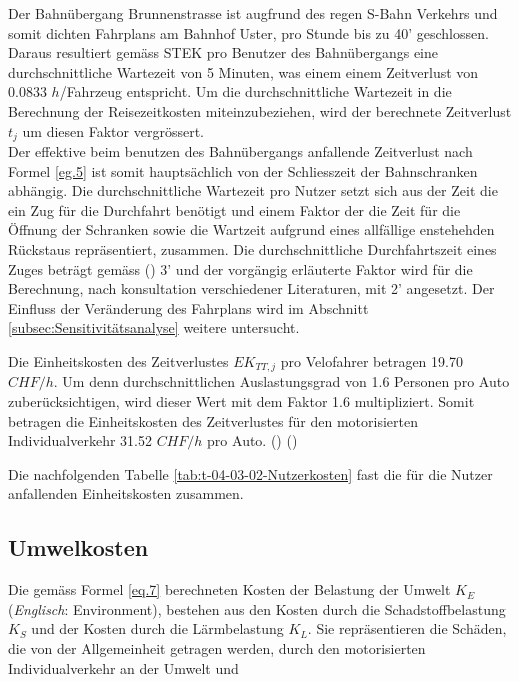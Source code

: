 \begin{IMleftrightskip}
Der Bahnübergang Brunnenstrasse ist augfrund des regen S-Bahn Verkehrs und somit dichten Fahrplans am Bahnhof Uster, pro Stunde bis zu 40' geschlossen. Daraus resultiert gemäss STEK pro Benutzer des Bahnübergangs eine durchschnittliche Wartezeit von 5 Minuten, was einem einem Zeitverlust von 0.0833 $h$/Fahrzeug entspricht. Um die durchschnittliche Wartezeit in die Berechnung der Reisezeitkosten miteinzubeziehen, wird der berechnete Zeitverlust $t_{j}$ um diesen Faktor vergrössert. \\
Der effektive beim benutzen des Bahnübergangs anfallende Zeitverlust nach Formel \ref{eg.5} ist somit hauptsächlich von der Schliesszeit der Bahnschranken abhängig. Die durchschnittliche Wartezeit pro Nutzer setzt sich aus der Zeit die ein Zug für die Durchfahrt benötigt und einem Faktor der die Zeit für die Öffnung der Schranken sowie die Wartzeit aufgrund eines allfällige enstehehden Rückstaus repräsentiert, zusammen. Die durchschnittliche Durchfahrtszeit eines Zuges beträgt gemäss (\cite{STEK}) 3' und der vorgängig erläuterte Faktor wird für die Berechnung, nach konsultation verschiedener Literaturen, mit 2' angesetzt. 
Der Einfluss der Veränderung des Fahrplans wird im Abschnitt \ref{subsec:Sensitivitätsanalyse} weitere untersucht. 
\end{IMleftrightskip}

Die Einheitskosten des Zeitverlustes $EK_{TT,j}$ pro Velofahrer betragen 19.70 $CHF/h$. Um denn durchschnittlichen Auslastungsgrad von 1.6 Personen pro Auto  zuberücksichtigen, wird dieser Wert mit dem Faktor 1.6 multipliziert. Somit betragen die Einheitskosten des Zeitverlustes für den motorisierten Individualverkehr 31.52 $CHF/h$ pro Auto. (\cite{Adey2012}) (\cite{Mikrozensus2015})


Die nachfolgenden Tabelle \ref{tab:t-04-03-02-Nutzerkosten} fast die für die Nutzer anfallenden Einheitskosten zusammen.


\newpage


\subsection*{Umwelkosten}
\label{subsec:Environment}


Die gemäss Formel \ref{eq.7} berechneten Kosten der Belastung der Umwelt $K_{E}$ (\textit{Englisch}: Environment), bestehen aus den Kosten durch die Schadstoffbelastung$K_{S}$ und der Kosten durch die Lärmbelastung $K_{L}$. Sie repräsentieren die Schäden, die von der Allgemeinheit getragen werden, durch den motorisierten Individualverkehr an der Umwelt und  

